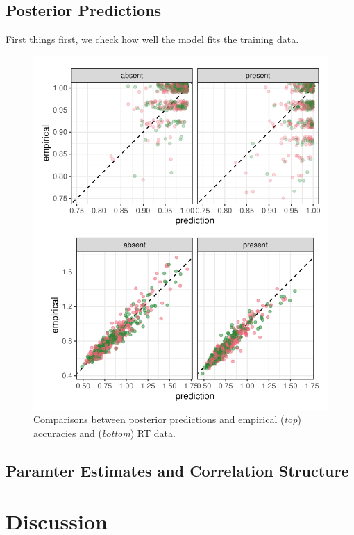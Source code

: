 \documentclass[11pt, twoside, twocolumn]{article}
\begin{document}
\subsection{Posterior Predictions}

First things first, we check how well the model fits the training data.

\begin{figure}
\centering
\includegraphics[width=\linewidth]{figs/exp_lvl_3_pred.pdf}
\caption{Comparisons between posterior predictions and empirical (\textit{top}) accuracies and (\textit{bottom}) RT data.}
\label{fig:lvl3_pred}
\end{figure}

\subsection{Paramter Estimates and Correlation Structure}

\section{Discussion}
\end{document}
